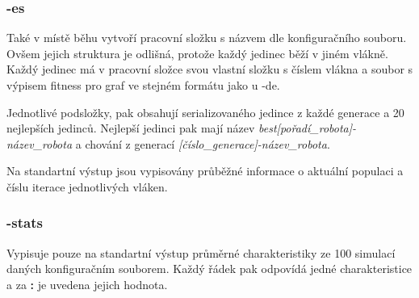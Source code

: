 \documentclass[12pt, oneside]{article}
\begin{document}
\subsubsection*{-es}
Také v místě běhu vytvoří pracovní složku s názvem dle konfiguračního souboru. Ovšem jejich struktura je odlišná, protože každý jedinec běží v jiném vlákně. Každý jedinec má v pracovní složce svou vlastní složku s číslem vlákna a soubor s výpisem fitness pro graf ve stejném formátu jako u -de.
\par
Jednotlivé podsložky, pak obsahují serializovaného jedince z každé generace a 20 nejlepších jedinců. Nejlepší jedinci pak mají název \textit{best[pořadí\_robota]-název\_robota} a chování z generací \textit{[číslo\_generace]-název\_robota}. 
\par 
Na standartní výstup jsou vypisovány průběžné informace o aktuální populaci a číslu iterace jednotlivých vláken. 
\subsubsection*{-stats}
Vypisuje pouze na standartní výstup průměrné charakteristiky ze 100 simulací daných konfiguračním souborem. Každý řádek pak odpovídá jedné charakteristice a za \textbf{:} je uvedena jejich hodnota.  \clearpage
\end{document}
